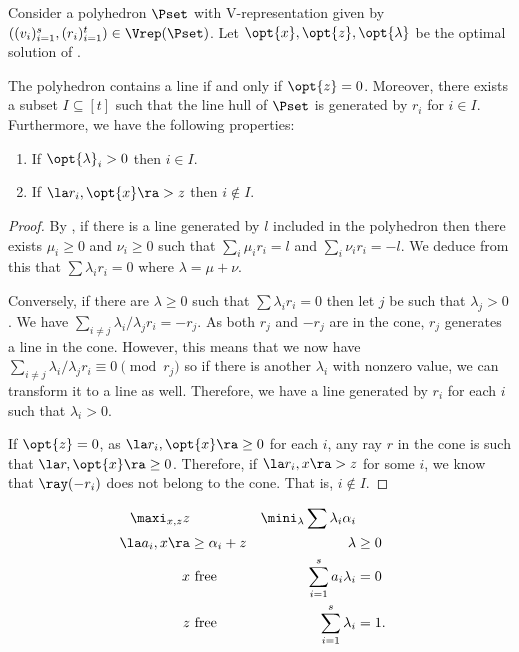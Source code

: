 \documentclass[11pt,twoside,a4paper,openright]{uclouvain-thesis}
\newcommand{\ineqnum}{s}
\begin{document}
\begin{myprop}
  \label{prop:linesubset}
  Consider a polyhedron $\Pset$ with V-representation given by
  $((v_i)_{i=1}^s, (r_i)_{i=1}^t) \in \Vrep(\Pset)$.
  Let $\opt{x}, \opt{z}, \opt{\lambda}$ be the optimal solution of .

  The polyhedron contains a line if and only if $\opt{z} = 0$.
  Moreover, there exists a subset $I \subseteq [t]$ such that
  the line hull of $\Pset$ is generated by $r_i$ for $i \in I$.
  Furthermore, we have the following properties:
  \begin{enumerate}
    \item
      \label{enum:dual_line}
      If $\opt{\lambda}_i > 0$ then $i \in I$.
    \item
      \label{enum:primal_line}
      If $\la r_i, \opt{x} \ra > z$ then $i \notin I$.
  \end{enumerate}

  \begin{proof}
    By , if there is a line generated by $l$ included in the polyhedron
    then there exists $\mu_i \ge 0$ and $\nu_i \ge 0$ such that
    $\sum_i \mu_i r_i = l$ and $\sum_i \nu_i r_i = -l$.
    We deduce from this that $\sum \lambda_i r_i = 0$ where $\lambda = \mu + \nu$.

    Conversely, if there are $\lambda \ge 0$ such that $\sum \lambda_i r_i = 0$ then let
    $j$ be such that $\lambda_j > 0$.
    We have $\sum_{i \neq j} \lambda_i/\lambda_j r_i = -r_j$.
    As both $r_j$ and $-r_j$ are in the cone,
    $r_j$ generates a line in the cone.
    However, this means that we now have $\sum_{i \neq j} \lambda_i/\lambda_j r_i \equiv 0 \pmod{r_j}$ so if there is another $\lambda_i$
    with nonzero value, we can transform it to a line as well.
    Therefore, we have a line generated by $r_i$ for each $i$ such that $\lambda_i > 0$.

    If $\opt{z} = 0$, as $\la r_i, \opt{x} \ra \ge 0$ for each $i$,
    any ray $r$ in the cone is such that $\la r, \opt{x} \ra \ge 0$.
    Therefore, if $\la r_i, x \ra > z$ for some $i$,
    we know that $\ray(-r_i)$ does not belong to the cone.
    That is, $i \notin I$.
  \end{proof}
\end{myprop}

\begin{myprog}
  \label{prog:aff}
  \begin{align*}
    \maxi_{x, z} z && \mini_{\lambda} \sum \lambda_i \alpha_i\\
    \la a_i, x \ra & \ge \alpha_i + z & \lambda & \ge 0\\
    x & \text{ free} & \sum_{i=1}^\ineqnum a_i \lambda_i & = 0\\
    z & \text{ free} & \sum_{i=1}^\ineqnum \lambda_i & = 1.
  \end{align*}
\end{myprog}
\end{document}
